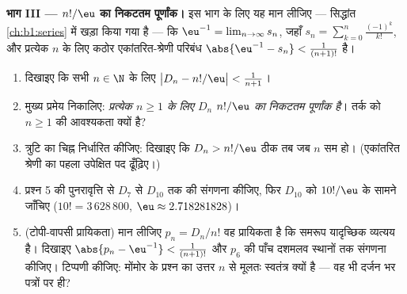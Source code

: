 \begin{problem}
\medskip \noindent\textbf{भाग III --- $n!/\eu$ का निकटतम पूर्णांक।} इस भाग
के लिए यह मान लीजिए --- सिद्धांत \cref{ch:b1:series} में खड़ा किया गया है
--- कि $\eu^{-1} = \lim_{n \to \infty} s_n$, जहाँ $s_n = \sum_{k=0}^{n}
\frac{(-1)^k}{k!}$, और प्रत्येक $n$ के लिए कठोर एकांतरित-श्रेणी परिबंध
$\abs{\eu^{-1} - s_n} < \frac1{(n+1)!}$ है।
\begin{enumerate}[resume]
  \item दिखाइए कि सभी $n \in \N$ के लिए $\bigl| D_n - n!/\eu \bigr| <
  \frac1{n+1}$।
  \item मुख्य प्रमेय निकालिए: \emph{प्रत्येक $n \geq 1$ के लिए $D_n$
  $n!/\eu$ का निकटतम पूर्णांक है}। तर्क को $n \geq 1$ की आवश्यकता क्यों है?
  \item त्रुटि का चिह्न निर्धारित कीजिए: दिखाइए कि $D_n > n!/\eu$ ठीक तब जब
  $n$ सम हो। (एकांतरित श्रेणी का पहला उपेक्षित पद ढूँढ़िए।)
  \item प्रश्न 5 की पुनरावृत्ति से $D_7$ से $D_{10}$ तक की संगणना कीजिए, फिर
  $D_{10}$ को $10!/\eu$ के सामने जाँचिए ($10! = 3\,628\,800$, $\eu \approx
  2.718281828$)।
  \item (टोपी-वापसी प्रायिकता) मान लीजिए $p_n = D_n/n!$ वह प्रायिकता है कि
  समरूप यादृच्छिक  व्यत्यय है। दिखाइए $\abs{p_n - \eu^{-1}} <
  \frac1{(n+1)!}$ और $p_6$ की पाँच दशमलव स्थानों तक संगणना कीजिए। टिप्पणी
  कीजिए: मोंमोर के प्रश्न का उत्तर $n$ से मूलतः स्वतंत्र क्यों है --- वह भी
  दर्जन भर पत्रों पर ही?
\end{enumerate}


\end{problem}
